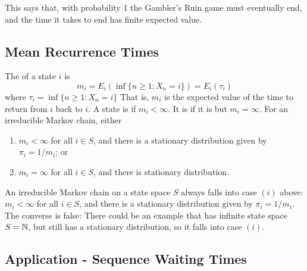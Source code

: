 \documentclass[11pt]{article}
\begin{document}
   \remark This says that, with probability 1 the Gambler's Ruin game must eventually end, and the time it takes to end has finite expected value.
    
    \subsection{Mean Recurrence Times}
     The  of a state $i$ is
    $$m_i = E_i(\inf\{n \geq 1: X_n = i\}) = E_i(\tau_i)$$
    where $\tau_i = \inf\{n \geq 1: X_n = i\}$
    \remark
    That is, $m_i$ is the expected value of the time to return from $i$ back to $i$.
    A state is  if $m_i < \infty$. It is  if it is  but $m_i = \infty$.
     For an irreducible Markov chain, either
    \begin{enumerate}
    	\item $m_i < \infty$ for all $i \in S$, and there is a  stationary distribution given by $\pi_i = 1/m_i$; or
    	\item $m_i = \infty$ for all $i \in S$, and there is  stationary distribution.
    \end{enumerate}
    
    \proposition An irreducible Markov chain on a  state space $S$ always falls into case $(i)$ above:\\
    $m_i < \infty$ for all $i \in S$, and there is a  stationary distribution given by $\pi_i = 1/m_i$.
    \remark
    The converse is false: There could be an example that has infinite state space $S = \mathbb{N}$, but still has a stationary distribution, so it falls into case $(i)$.
    \subsection{Application - Sequence Waiting Times}
\end{document}
